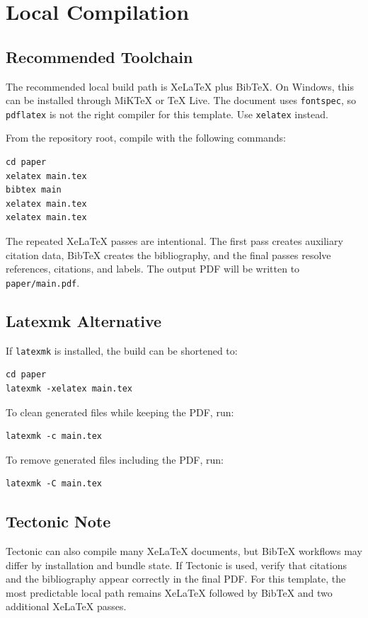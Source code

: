 \section{Local Compilation}

\subsection{Recommended Toolchain}

The recommended local build path is XeLaTeX plus BibTeX. On Windows, this can be installed through MiKTeX or TeX Live. The document uses \texttt{fontspec}, so \texttt{pdflatex} is not the right compiler for this template. Use \texttt{xelatex} instead.

From the repository root, compile with the following commands:
\begin{verbatim}
cd paper
xelatex main.tex
bibtex main
xelatex main.tex
xelatex main.tex
\end{verbatim}

The repeated XeLaTeX passes are intentional. The first pass creates auxiliary citation data, BibTeX creates the bibliography, and the final passes resolve references, citations, and labels. The output PDF will be written to \texttt{paper/main.pdf}.

\subsection{Latexmk Alternative}

If \texttt{latexmk} is installed, the build can be shortened to:
\begin{verbatim}
cd paper
latexmk -xelatex main.tex
\end{verbatim}

To clean generated files while keeping the PDF, run:
\begin{verbatim}
latexmk -c main.tex
\end{verbatim}

To remove generated files including the PDF, run:
\begin{verbatim}
latexmk -C main.tex
\end{verbatim}

\subsection{Tectonic Note}

Tectonic can also compile many XeLaTeX documents, but BibTeX workflows may differ by installation and bundle state. If Tectonic is used, verify that citations and the bibliography appear correctly in the final PDF. For this template, the most predictable local path remains XeLaTeX followed by BibTeX and two additional XeLaTeX passes.

